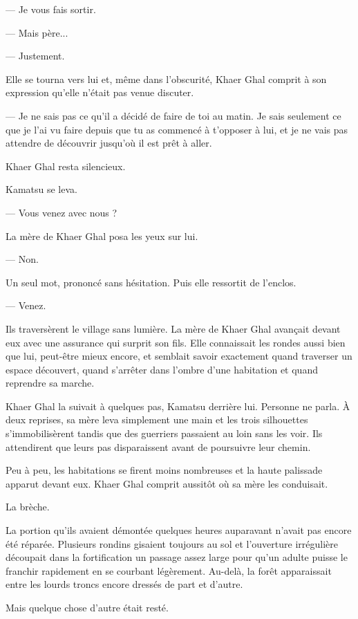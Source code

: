 — Je vous fais sortir.

— Mais père...

— Justement.

Elle se tourna vers lui et, même dans l'obscurité, Khaer Ghal comprit à son
expression qu'elle n'était pas venue discuter.

— Je ne sais pas ce qu'il a décidé de faire de toi au matin. Je sais seulement
ce que je l'ai vu faire depuis que tu as commencé à t'opposer à lui, et je ne
vais pas attendre de découvrir jusqu'où il est prêt à aller.

Khaer Ghal resta silencieux.

Kamatsu se leva.

— Vous venez avec nous ?

La mère de Khaer Ghal posa les yeux sur lui.

— Non.

Un seul mot, prononcé sans hésitation. Puis elle ressortit de l'enclos.

— Venez.

\scenebreak

Ils traversèrent le village sans lumière. La mère de Khaer Ghal avançait devant
eux avec une assurance qui surprit son fils. Elle connaissait les rondes aussi
bien que lui, peut-être mieux encore, et semblait savoir exactement quand
traverser un espace découvert, quand s'arrêter dans l'ombre d'une habitation et
quand reprendre sa marche.

Khaer Ghal la suivait à quelques pas, Kamatsu derrière lui. Personne ne parla.
À deux reprises, sa mère leva simplement une main et les trois silhouettes
s'immobilisèrent tandis que des guerriers passaient au loin sans les voir. Ils
attendirent que leurs pas disparaissent avant de poursuivre leur chemin.

Peu à peu, les habitations se firent moins nombreuses et la haute palissade
apparut devant eux. Khaer Ghal comprit aussitôt où sa mère les conduisait.

La brèche.

La portion qu'ils avaient démontée quelques heures auparavant n'avait pas
encore été réparée. Plusieurs rondins gisaient toujours au sol et l'ouverture
irrégulière découpait dans la fortification un passage assez large pour qu'un
adulte puisse le franchir rapidement en se courbant légèrement. Au-delà, la
forêt apparaissait entre les lourds troncs encore dressés de part et d'autre.

Mais quelque chose d'autre était resté.

